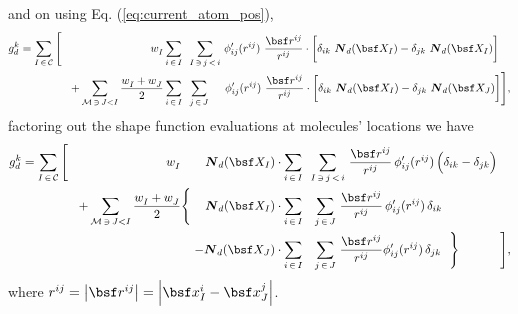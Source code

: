 \documentclass[a4paper,10pt]{article}
\newcommand{\refeq}[1]{Eq. (\ref{eq:#1})}
\def\gz  #1{           \mbox{\boldmath $\mit #1$}}
\newcommand{\norm}[1]{\left\lvert #1 \right\rvert}
\def\mcl  #1{               {\cal #1}}
\begin{document}
and on using \refeq{current_atom_pos},
\begin{align}
 g^k_d = \sum_{I \, \in \, \mcl C}
	  \Bigg[
            \,\,\,\,\,\,\,\,\,\,\,\,
            \,\,\,\,\,\,\,\,\,\,\,\,
            \,\,\,\,\,\,\,\,\,\,\,\,
            \,\,\,\,\,\,\,\,\,\,\,\,
		w^{}_I
		&\sum_{i \, \in \, I}       \,\,\,
		\sum_{I \, \ni \, j \, < \, i}       \,
		  {\phi}^\prime_{ij} (r^{ij})\, \, 
		    \frac {\bsf r^{ij}}{r^{ij}}
		    \cdot
		    \bigg[
		      \delta_{ik} \,\, \gz N_d( \bsf X_{I})  
		      - 
		      \delta_{jk} \,\, \gz N_d( \bsf X_{I})
		    \bigg] \\
	      +
	      \sum_{\mcl M \, \ni \, J < I}
	      \frac{w^{}_I + w^{}_J}{2}
	      &\sum_{i \, \in \, I}       \,\,\,
	      \sum_{j \, \in \, J}       \,\,\,\,\,\,\,\,
		  {\phi}^\prime_{ij} (r^{ij})\, \, 
		  \frac {\bsf r^{ij}}{r^{ij}}
		  \cdot
		  \bigg[
		    \delta_{ik} \,\, \gz N_d( \bsf X_{I})  
		    - 
		    \delta_{jk} \,\, \gz N_d( \bsf X_{J})
		  \bigg]
	 \Bigg],
\end{align}
factoring out the shape function evaluations at molecules' locations we have
\begin{align}
 g^k_d = \sum_{I \, \in \, \mcl C}
	  \Bigg[
		\,\,\,\,\,\,\,\,\,\,\,\,
		\,\,\,\,\,\,\,\,\,\,\,\,
		\,\,\,\,\,\,\,\,\,\,\,\,
		\,\,\,\,\,\,\,\,\,\,\,\,
		w^{}_I
		\,\,\,\,\,\,\,\,\,\,\,\,
		\gz N_d( \bsf X_{I})
		&\cdot
		  \sum_{i \, \in \, I}            \,\,\,
		  \sum_{I \, \ni \, j \, < \, i} \,
		  \frac {\bsf r^{ij}}{r^{ij}}               \,
		    {\phi}^\prime_{ij} (r^{ij})        \,
		      \Big(
			\delta_{ik} 
			- 
			\delta_{jk}
		      \Big)
		\\
	      + 
		\sum_{\mcl M \, \ni \, J < I}
		\frac{w^{}_I + w^{}_J}{2}
		\Bigg\{
		  \,\,\,\,\,\,\,
		  \gz N_d( \bsf X_{I})
		  &\cdot
		    \sum_{i \, \in \, I}    \,\,\,\,\,
		    \sum_{j \, \in \, J}   \,
		    \frac {\bsf r^{ij}}{r^{ij}}       \,
		      {\phi}^\prime_{ij}(r^{ij}) \,
		      \delta_{ik}           \,
		    \\
		  -
		  \gz N_d( \bsf X_{J})
		  &\cdot
		    \sum_{i \, \in \, I}    \,\,\,\,\,
		    \sum_{j \, \in \, J}    \,
		    \frac{\bsf r^{ij}}{r^{ij}}
		      {\phi}^\prime_{ij}(r^{ij}) \,
		      \delta_{jk}           \,
		\,\,\,
		\Bigg\}
		\,\,\,\,\,\,\,\,\,\,\,\,\,\,\,\,\,\,\,\,
	 \Bigg],
\end{align}
where $r^{ij} = \norm{\bsf r^{ij}} = \norm{ \bsf x^{i}_{I} - \bsf x^{j}_{J} }$.
\end{document}
